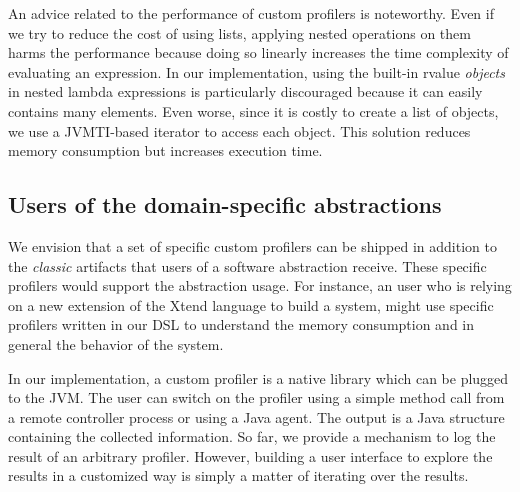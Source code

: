 An advice related to the performance of custom profilers is noteworthy.
Even if we try to reduce the cost of using lists, applying nested operations on them harms the performance because doing so linearly increases the time complexity of evaluating an expression.
In our implementation, using the built-in rvalue \textit{objects} in nested lambda expressions is particularly discouraged because it can easily contains many elements.
Even worse, since it is costly to create a list of objects, we use a JVMTI-based iterator to access each object.
This solution reduces memory consumption but increases execution time.

\subsection{Users of the domain-specific abstractions}

We envision that a set of specific custom profilers can be shipped in addition to the \textit{classic} artifacts that users of a software abstraction receive. 
These specific profilers would support the abstraction usage.
For instance, an user who is relying on a new extension of the Xtend language to build a system, might use specific profilers written in our DSL to understand the memory consumption and in general the behavior of the system.

In our implementation, a custom profiler is a native library which can be plugged to the JVM.
The user can switch on the profiler using a simple method call from a remote controller process or using a Java agent.
The output is a Java structure containing the collected information.
So far, we provide a mechanism to log the result of an arbitrary profiler.
However, building a user interface to explore the results in a customized way is simply a matter of iterating over the results.  






